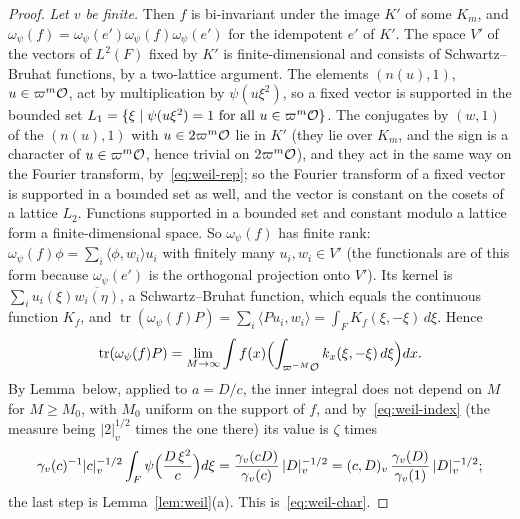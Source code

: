 \begin{proof}
\emph{Let $v$ be finite.} Then $f$ is bi-invariant under the image $K'$ of
some $K_m$, and $\omega_\psi(f)=\omega_\psi(e')\omega_\psi(f)\omega_\psi(e')$
for the idempotent $e'$ of $K'$. The space $V'$ of the vectors of
$L^2(F)$ fixed by $K'$ is finite-dimensional and consists of
Schwartz--Bruhat functions, by a two-lattice argument. The elements $(n(u),1)$, $u\in\varpi^m\mathcal{O}$, act by multiplication
by $\psi(u\xi^2)$, so a fixed vector is supported in the bounded set
$L_1=\{\xi\mid\psi(u\xi^2)=1\text{ for all }u\in\varpi^m\mathcal{O}\}$. The
conjugates by $(w,1)$ of the $(n(u),1)$ with $u\in2\varpi^m\mathcal{O}$ lie in $K'$
(they lie over $K_m$, and the sign is a character of $u\in\varpi^m\mathcal{O}$,
hence trivial on $2\varpi^m\mathcal{O}$), and they act in the same way on the
Fourier transform, by~\eqref{eq:weil-rep}; so the Fourier
transform of a fixed vector is supported in a bounded set as well, and the
vector is constant on the cosets of a lattice $L_2$. Functions supported in a
bounded set and constant modulo a lattice form a finite-dimensional space.
So $\omega_\psi(f)$ has finite rank: $\omega_\psi(f)\phi=\sum_i\langle
\phi,w_i\rangle u_i$ with finitely many $u_i,w_i\in V'$ (the functionals
are of this form because $\omega_\psi(e')$ is the orthogonal projection
onto $V'$). Its kernel is $\sum_iu_i(\xi)\overline{w_i(\eta)}$, a
Schwartz--Bruhat function, which equals the continuous function $K_f$,
and $\operatorname{tr}(\omega_\psi(f)P)=\sum_i\langle Pu_i,w_i\rangle=
\int_FK_f(\xi,-\xi)\,d\xi$. Hence
\[
\operatorname{tr}(\omega_\psi(f)P)=\lim_{M\to\infty}\int f(x)\Bigl(
\int_{\varpi^{-M}\mathcal{O}}k_x(\xi,-\xi)\,d\xi\Bigr)dx .
\]
By Lemma~\shellref below, applied to $a=D/c$, the inner integral
does not depend on $M$ for $M\ge M_0$, with $M_0$ uniform on the support
of $f$, and by~\eqref{eq:weil-index} (the measure being $|2|_v^{1/2}$ times
the one there) its value is $\zeta$ times
\[
\gamma_v(c)^{-1}|c|_v^{-1/2}\int_F\psi\Bigl(\frac{D\,\xi^2}{c}\Bigr)d\xi
=\frac{\gamma_v(cD)}{\gamma_v(c)}\,|D|_v^{-1/2}
=(c,D)_v\,\frac{\gamma_v(D)}{\gamma_v(1)}\,|D|_v^{-1/2};
\]
the last step is Lemma~\ref{lem:weil}(a). This is~\eqref{eq:weil-char}.


\end{proof}
